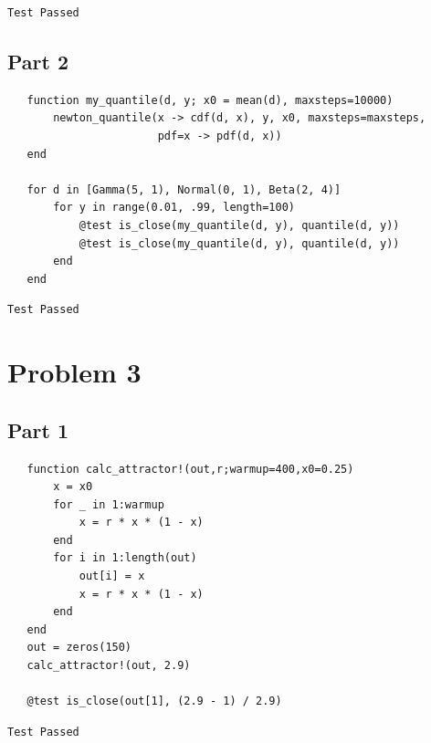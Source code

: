 \documentclass[nobib]{tufte-handout}
\begin{document}
\begin{verbatim}
Test Passed
\end{verbatim}
\subsection{Part 2}
\label{sec:orge97a125}
\begin{verbatim}
   function my_quantile(d, y; x0 = mean(d), maxsteps=10000)
       newton_quantile(x -> cdf(d, x), y, x0, maxsteps=maxsteps,
                       pdf=x -> pdf(d, x))
   end

   for d in [Gamma(5, 1), Normal(0, 1), Beta(2, 4)]
       for y in range(0.01, .99, length=100)
           @test is_close(my_quantile(d, y), quantile(d, y))
           @test is_close(my_quantile(d, y), quantile(d, y))
       end
   end
\end{verbatim}

\begin{verbatim}
Test Passed
\end{verbatim}
\section{Problem 3}
\label{sec:org46dd8d6}
\subsection{Part 1}
\label{sec:org11ce445}
\begin{verbatim}
   function calc_attractor!(out,r;warmup=400,x0=0.25)
       x = x0
       for _ in 1:warmup
           x = r * x * (1 - x)
       end
       for i in 1:length(out)
           out[i] = x
           x = r * x * (1 - x)
       end
   end
   out = zeros(150)
   calc_attractor!(out, 2.9)

   @test is_close(out[1], (2.9 - 1) / 2.9)
\end{verbatim}

\begin{verbatim}
Test Passed
\end{verbatim}
\end{document}
